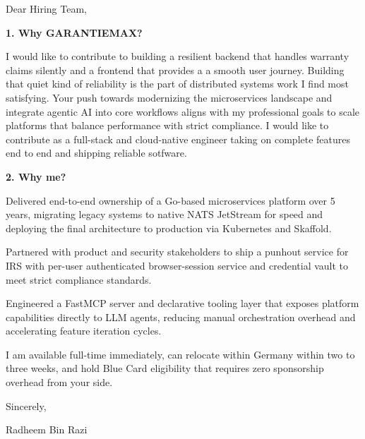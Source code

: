 \documentclass[11pt,a4paper]{coverletter}
\begin{document}

\opening{Dear Hiring Team,}

\vspace{8pt}\noindent\textbf{1. Why GARANTIEMAX?}\par\vspace{3pt}

I would like to contribute to building a resilient backend that handles warranty claims silently and a frontend that provides a a smooth user journey. Building that quiet kind of reliability is the part of distributed systems work I find most satisfying. Your push towards modernizing the microservices landscape and integrate agentic AI into core workflows aligns with my professional goals to scale platforms that balance performance with strict compliance. I would like to contribute as a full-stack and cloud-native engineer taking on complete features end to end and shipping reliable sotfware.

\vspace{8pt}\noindent\textbf{2. Why me?}\par\vspace{3pt}

\bullets

  \item Delivered end-to-end ownership of a Go-based microservices platform over 5 years, migrating legacy systems to native NATS JetStream for speed and deploying the final architecture to production via Kubernetes and Skaffold.

  \item Partnered with product and security stakeholders to ship a punhout service for IRS with per-user authenticated browser-session service and credential vault to meet strict compliance standards.

  \item Engineered a FastMCP server and declarative tooling layer that exposes platform capabilities directly to LLM agents, reducing manual orchestration overhead and accelerating feature iteration cycles.

\bulletsend

I am available full-time immediately, can relocate within Germany within two to three weeks, and hold Blue Card eligibility that requires zero sponsorship overhead from your side.

\closing{Sincerely,}{Radheem Bin Razi}

\clearpage
{}
\end{document}
